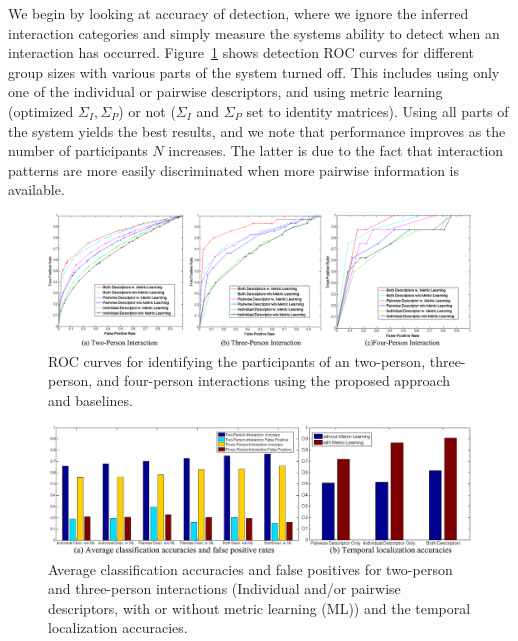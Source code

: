 We begin by looking at accuracy of detection, where we ignore the inferred interaction categories and simply measure the systems ability to detect when an interaction has occurred. Figure~\ref{ROC} shows detection ROC curves for different group sizes with various parts of the system turned off. This includes using only one of the individual or pairwise descriptors, and using metric learning (optimized $\Sigma_I,\Sigma_P$) or not ($\Sigma_I$ and $\Sigma_P$ set to identity matrices). Using all parts of the system yields the best results, and we note that performance improves as the number of participants $N$ increases. The latter is due to the fact that interaction patterns are more easily discriminated when more pairwise information is available.

\begin{figure}[t]
\begin{center}
\includegraphics[scale=2.5]{ROC.png}
\end{center}
\caption{ROC curves for identifying the participants of an two-person, three-person, and four-person interactions using the proposed approach and baselines.  }
\label{ROC}
\end{figure}


\begin{figure}[t]
\begin{center}
\includegraphics[scale=2.5]{classtemporal.png}
\end{center}
\caption{Average classification accuracies and false positives for two-person and three-person interactions (Individual and/or pairwise descriptors, with or without metric learning (ML)) and the temporal localization accuracies.}
\label{classtemporal}
\end{figure}

